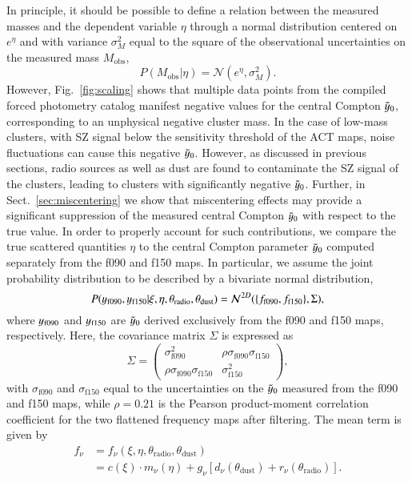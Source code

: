 \documentclass[longauth]{aa} %
\newcommand{\yc}{$\Tilde{\vary}_0$\xspace}
\begin{document}
In principle, it should be possible to define a relation between the measured masses and the dependent variable $\eta$ through a normal distribution centered on $e^{\eta}$ and with variance $\sigma^2_{M}$ equal to the square of the observational uncertainties on the measured mass $M_{\mathrm{obs}}$,
\begin{equation}
    P(M_{\mathrm{obs}}|\eta) = \mathcal{N}(e^{\eta},\sigma^2_{M}).
\end{equation} 
%
However, Fig.~\ref{fig:scaling} shows that multiple data points from the compiled forced photometry catalog manifest negative values for the central Compton \yc, corresponding to an unphysical negative cluster mass. In the case of low-mass clusters, with SZ signal below the sensitivity threshold of the ACT maps, noise fluctuations can cause this negative \yc. However, as discussed in previous sections, radio sources as well as dust are found to contaminate the SZ signal of the clusters, leading to clusters with significantly negative \yc. Further, in Sect.~\ref{sec:miscentering} we show that miscentering effects may provide a significant suppression of the measured central Compton $\Tilde{\vary}_0$ with respect to the true value. In order to properly account for such contributions, we compare the true scattered quantities $\eta$ to the central Compton parameter $\Tilde{\vary}_0$ computed separately from the f090 and f150 maps. In particular, we assume the joint probability distribution to be described by a bivariate normal distribution,
\begin{equation}
     P(\vary_{\mathrm{f090}},\vary_{\mathrm{f150}}|\xi,\eta,\theta_{\mathrm{radio}},\theta_{\mathrm{dust}}) = \mathcal{N}^{2D}(\{f_{\mathrm{f090}},f_{\mathrm{f150}}\},\Sigma),
    \label{eq:like1}
\end{equation}
where $\vary_{\mathrm{f090}}$ and $\vary_{\mathrm{f150}}$ are \yc derived exclusively from the f090 and f150 maps, respectively. Here, the covariance matrix $\Sigma$ is expressed as
\begin{equation}
    \Sigma = \begin{pmatrix} \sigma^2_{\mathrm{f090}} & \rho\sigma_{\mathrm{f090}}\sigma_{\mathrm{f150}} \\
                             \rho\sigma_{\mathrm{f090}}\sigma_{\mathrm{f150}} & \sigma^2_{\mathrm{f150}}\end{pmatrix}
   \label{eq:post1}
,\end{equation}
with $\sigma_{\mathrm{f090}}$ and $\sigma_{\mathrm{f150}}$ equal to the uncertainties on the $\tilde{\vary}_0$ measured from the f090 and f150 maps, while $\rho=0.21$ is the Pearson product-moment correlation coefficient for the two flattened frequency maps after filtering. The mean term is given by
\begin{align}
    f_{\nu} &= f_{\nu}(\xi,\eta,\theta_{\mathrm{radio}},\theta_{\mathrm{dust}}) \nonumber\\
            &= c(\xi)\cdot m_{\nu}(\eta)+g_{\nu}\left[d_{\nu}(\theta_{\mathrm{dust}})+r_{\nu}(\theta_{\mathrm{radio}})\right].
    \label{eq:like2}
\end{align}
\end{document}
